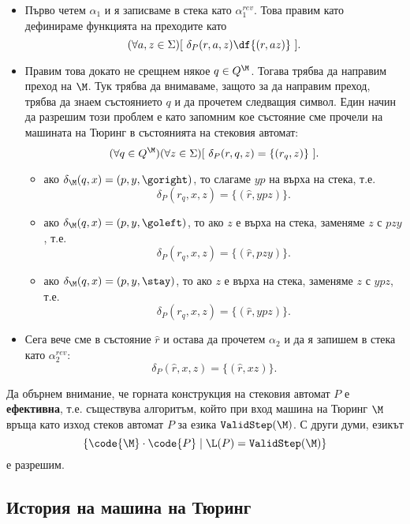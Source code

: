 \begin{hint}
  \begin{itemize}
  \item
    Първо четем $\alpha_1$ и я записваме в стека като $\alpha^{rev}_1$.
    Това правим като дефинираме функцията на преходите като 
    \[(\forall a,z \in \Sigma)[\ \delta_{P}(r,a,z) \df \{(r,az)\}\ ].\]
  \item 
    Правим това докато не срещнем някое $q \in Q^\M$. Тогава трябва да направим преход на $\M$.
    Тук трябва да внимаваме, защото за да направим преход, трябва да знаем състоянието $q$ и да прочетем следващия символ.
    Един начин да разрешим този проблем е като запомним кое състояние сме прочели на машината на Тюринг в състоянията на стековия автомат:
    \[(\forall q \in Q^\M)(\forall z \in \Sigma)[\ \delta_{P}(r,q,z) = \{(r_q,z)\}\ ].\]
    \begin{itemize}
    \item 
      ако $\delta_\M(q,x) = (p,y,\goright)$, то слагаме $yp$ на върха на стека, т.е.
      \[\delta_{P}(r_q,x,z) = \{(\hat{r}, ypz)\}.\]
    \item
      ако $\delta_\M(q,x) =(p,y,\goleft)$, то ако $z$ е върха на стека, заменяме $z$ с $pzy$, т.е.
      \[\delta_{P}(r_q,x,z) = \{(\hat{r}, pzy)\}.\]
    \item
      ако $\delta_\M(q,x) =(p,y,\stay)$, то ако $z$ е върха на стека, заменяме $z$ с $ypz$, т.е.
      \[\delta_{P}(r_q,x,z) = \{(\hat{r}, ypz)\}.\]
    \end{itemize}
  \item
    Сега вече сме в състояние $\hat{r}$ и остава да прочетем $\alpha_2$ и да я запишем в стека като $\alpha^{rev}_2$:
    \[\delta_{P}(\hat{r},x,z) = \{(\hat{r}, xz)\}.\]
  \end{itemize}
\end{hint}

\begin{remark}
  Да обърнем внимание, че горната конструкция на стековия автомат $P$ е {\bf ефективна}, т.е.
  съществува алгоритъм, който при вход машина на Тюринг $\M$ връща като изход стеков автомат $P$ за езика $\texttt{ValidStep}(\M)$.
  С други думи, езикът 
  \[\{\code{\M} \cdot \code{P} \mid \L(P) = \texttt{ValidStep}(\M)\}\]
  е разрешим.
\end{remark}

\subsection*{История на машина на Тюринг}

